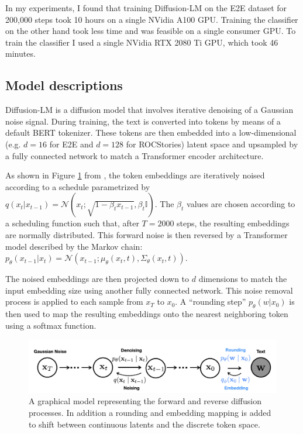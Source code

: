In my experiments, I found that training Diffusion-LM on the E2E dataset for 200,000 steps took 10 hours on a single NVidia A100 GPU. Training the classifier on the other hand took less time and was feasible on a single consumer GPU. To train the classifier I used a single NVidia RTX 2080 Ti GPU, which took 46 minutes.

\subsection{Model descriptions}

Diffusion-LM is a diffusion model that involves iterative denoising of a Gaussian noise signal. During training, the text is converted into tokens by means of a default BERT tokenizer. These tokens are then embedded into a low-dimensional (e.g. $d=16$ for E2E\cite{novikova2017e2e} and $d=128$ for ROCStories\cite{mostafazadeh2016corpus}) latent space and upsampled by a fully connected network to match a Transformer encoder architecture.

As shown in Figure \ref{fig:graphical-model} from \cite{li2022diffusion}, the token embeddings are iteratively noised according to a schedule parametrized by $q(x_t | x_{t-1}) = \mathcal{N}(x_t; \sqrt{1-\beta_t x_{t-1}}, \beta_t \mathbb{I})$. The $\beta_t$ values are chosen according to a scheduling function such that, after $T=2000$ steps, the resulting embeddings are normally distributed. This forward noise is then reversed by a Transformer model described by the Markov chain: $p_\theta(x_{t-1}|x_t) = \mathcal{N}(x_{t-1}; \mu_\theta(x_t, t), \Sigma_\theta (x_t, t))$.

The noised embeddings are then projected down to $d$ dimensions to match the input embedding size using another fully connected network. This noise removal process is applied to each sample from $x_T$ to $x_0$. A ``rounding step'' $p_\theta (w|x_0)$ is then used to map the resulting embeddings onto the nearest neighboring token using a softmax function.

\begin{figure}[h]
\includegraphics[scale=0.3]{images/diffusion-lm-graphical-model.png}
\centering
\caption{A graphical model representing the forward and reverse diffusion processes. In addition a rounding and embedding mapping is added to shift between continuous latents and the discrete token space.}
\label{fig:graphical-model}
\end{figure}


